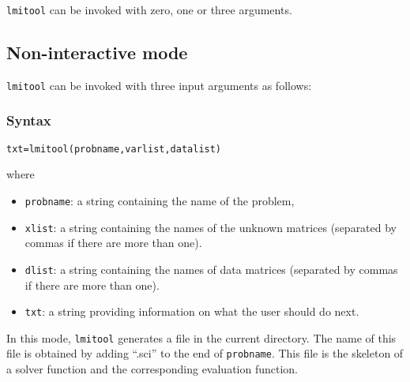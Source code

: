\documentclass{article}
\begin{document}
{\tt lmitool} can be invoked with zero, one or three arguments.

\subsection{Non-interactive mode}
{\tt lmitool} can be invoked with three input arguments as follows:

\subsubsection{Syntax}
\begin{verbatim}
txt=lmitool(probname,varlist,datalist)
\end{verbatim}
where
\begin{itemize}
\item
{\tt probname}: a string containing the name of the problem,
\item
{\tt xlist}: a string containing the names of the unknown matrices
(separated by commas if there are more than one).
\item
{\tt dlist}: a string containing the names of  data matrices (separated
by commas if there are more than one). 
\item
{\tt txt}: a string providing information on what the user should do
next.
\end{itemize}

In this mode, {\tt lmitool} generates a file in the current
directory. The name of this file is obtained by adding ``.sci''
to the end of {\tt probname}. This file is the skeleton of
a solver function and the corresponding evaluation function.
\end{document}
